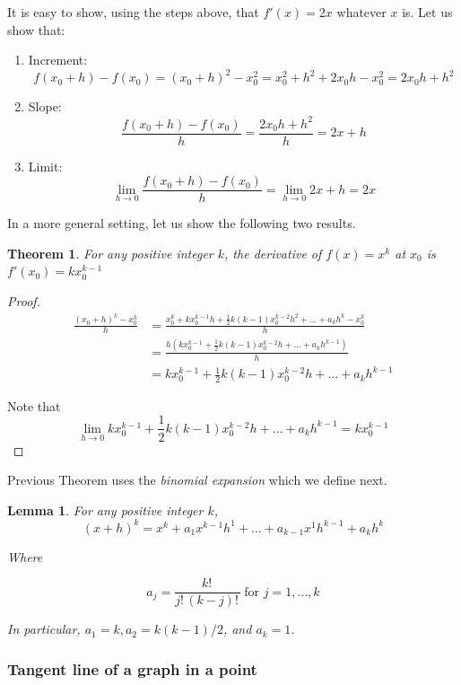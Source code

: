 \documentclass[a4paper,11pt]{article}
\theoremstyle{definition}
\theoremstyle{plain}
\newtheorem{theorem}{Theorem}
\newtheorem{lemma}{Lemma}
\begin{document}
It is easy to show, using the steps above, that \(f'(x) = 2x\) whatever
\(x\) is. Let us show that:

\begin{enumerate}
\def\labelenumi{\arabic{enumi}.}
\item
  Increment: \[
  f(x_0 + h)-f(x_0) = (x_0+h)^2-x_0^2 = x_0^2+h^2+2x_0h-x_0^2 = 2x_0 h +h^2
  \]
\item
  Slope: \[
  \frac{f(x_0+h)-f(x_0)}{h} = \frac{2x_0 h +h^2}{h} = 2x + h
  \]
\item
  Limit: \[
  \lim_{h\rightarrow 0}{\frac{f(x_0+h)-f(x_0)}{h}} = \lim_{h\rightarrow 0}{2x+h} = 2x
  \]
\end{enumerate}

In a more general setting, let us show the following two results.

\begin{theorem}
For any positive integer \(k\), the derivative of
\(f(x) = x^k\) at \(x_0\) is \(f'(x_0) = k x_0^{k-1}\)
\end{theorem}

\begin{proof}
\begin{align*}
\frac{(x_0+h)^k-x_0^k}{h} &= \frac{x_0^k+kx_0^{k-1}h + \frac{1}{2}k(k-1)x_0^{k-2}h^2+\ldots+a_kh^k-x_0^k}{h} \\
&= \frac{h(kx_0^{k-1} + \frac{1}{2}k(k-1)x_0^{k-2}h + \ldots + a_k h^{k-1})}{h} \\
&= kx_0^{k-1}  + \frac{1}{2}k(k-1)x_0^{k-2}h + \ldots + a_k h^{k-1}
\end{align*}

Note that \[
\lim_{h\rightarrow 0}{kx_0^{k-1}  + \frac{1}{2}k(k-1)x_0^{k-2}h + \ldots + a_k h^{k-1}} = kx_0^{k-1}
\]
\end{proof}

Previous Theorem uses the \emph{binomial expansion} which we define
next.

\begin{lemma}
For any positive integer \(k\), \[
(x + h)^k = x^k + a_1 x^{k-1}h^1+\ldots+a_{k-1}x^1 h^{k-1} + a_k h^k
\]

Where

\[
a_j = \frac{k!\,}{j!\,(k-j)!\,} \ \text{for } j = 1, \ldots, k
\]

In particular, \(a_1 = k, a_2 = k(k-1) / 2\), and \(a_k = 1\).
\end{lemma}

\subsubsection{Tangent line of a graph in a
point}\label{tangent-line-of-a-graph-in-a-point}
\end{document}
